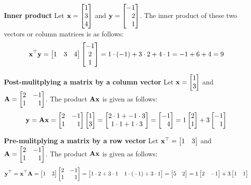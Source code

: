 \begin{boxedstuff}
    \begin{example}
        \textbf{Inner product} Let $\mf{x} = \bmxc 1 \\ 3 \\ 4 \emx$ and $\mf{y} = \bmx -1 \\ 2 \\ 1 \emx$. The inner product of these two vectors or column matrices is as follows:
        \[ \mf{x}^\top\mf{y} = \bmxc 1 & 3 & 4 \emx \bmxc -1 \\ 2 \\ 1 \emx = 1 \cdot \pp{-1} + 3 \cdot 2 + 4 \cdot 1 = -1 + 6 + 4 = 9\]
        \label{example:ch02-mat-mul-inn-prod}
    \end{example}

    \begin{example}
        \textbf{Post-mulitplying a matrix by a column vector} Let $\mf{x} = \bmxc 1 \\ 3 \emx$ and $\mf{A} = \bmx 2 & -1 \\ 1 & 1 \emx$. The product $\mathbf{A}\mathbf{x}$ is given as follows:
        \[ \mf{y} = \mf{A}\mf{x} = \bmx 2 & -1 \\ 1 & 1 \emx \bmxc 1 \\ 3 \emx = \bmxc 2 \cdot 1 + -1 \cdot 3 \\ 1 \cdot 1 + 1 \cdot 3 \emx = \bmx -1 \\ 4 \emx = 1\bmx 2 \\ 1\emx + 3\bmx -1 \\ 1\emx \]
        \label{example:ch02-mat-post-mul-col-vec}
    \end{example}

    \begin{example}
        \textbf{Pre-mulitplying a matrix by a row vector} Let $\mf{x}^\top = \bmxc 1 & 3 \emx$ and $\mf{A} = \bmx 2 & -1 \\ 1 & 1 \emx$. The product $\mathbf{A}\mathbf{x}$ is given as follows:
        \[ \mf{y}^\top = \mf{x}^\top\mf{A} = \bmxc 1 & 3 \emx \bmx 2 & -1 \\ 1 & 1 \emx = \bmxc 1 \cdot 2 + 3 \cdot 1 & 1 \cdot \pp{-1} + 3 \cdot 1 \emx = \bmx 5 & 2 \emx = 1\bmx 2 & -1\emx + 3\bmx 1 & 1 \emx \]
        \label{example:ch02-mat-pre-mul-row-vec}
    \end{example}


\end{boxedstuff}
